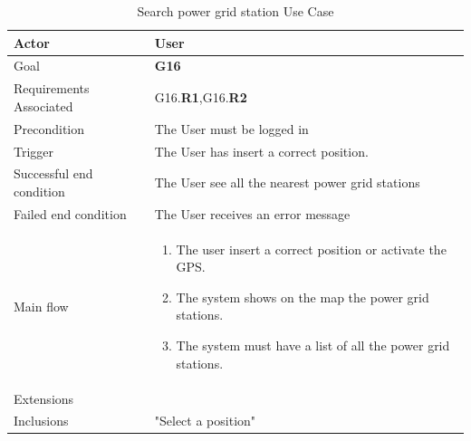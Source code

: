 \newline
\begin{table}[htb]
\begin{center}
\renewcommand{\arraystretch}{1.5}
\begin{tabular}{|l|p{}|}
\hline
Actor & User \\ \hline
Goal & \textbf{G16} \\ \hline
Requirements Associated & G16.\textbf{R1},G16.\textbf{R2} \\ \hline
Precondition & The User must be logged in \\ \hline
Trigger & The User has insert a correct position. \\ \hline
Successful end condition & The User see all the nearest power grid stations \\ \hline
Failed end condition & The User receives an error message \\ \hline
Main flow & \begin{minipage}[t]{0.6\textwidth}
\begin{enumerate}
\addtolength{\itemindent}{0.5cm}
\item The user insert a correct position or activate the GPS.
\item The system shows on the map the power grid stations.
\item The system must have a list of all the power grid stations.
\end{enumerate}
\end{minipage} \\ \hline
Extensions & \\ \hline
Inclusions & "Select a position" \\ \hline
\end{tabular}
\caption{Search power grid station Use Case}
\end{center}
\end{table}
\clearpage

